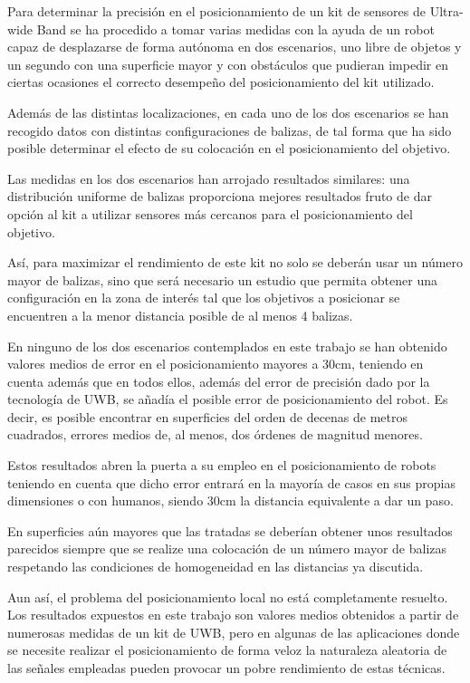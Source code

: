 Para determinar la precisión en el posicionamiento de un kit de sensores de Ultra-wide Band se ha procedido a tomar varias medidas con la ayuda de un robot capaz de desplazarse de forma autónoma en dos escenarios, uno libre de objetos y un segundo con una superficie mayor y con obstáculos que pudieran impedir en ciertas ocasiones el correcto desempeño del posicionamiento del kit utilizado.

Además de las distintas localizaciones, en cada uno de los dos escenarios se han recogido datos con distintas configuraciones de balizas, de tal forma que ha sido posible determinar el efecto de su colocación en el posicionamiento del objetivo.

Las medidas en los dos escenarios han arrojado resultados similares: una distribución uniforme de balizas proporciona mejores resultados fruto de dar opción al kit a utilizar sensores más cercanos para el posicionamiento del objetivo.

Así, para maximizar el rendimiento de este kit no solo se deberán usar un número mayor de balizas, sino que será necesario un estudio que permita obtener una configuración en la zona de interés tal que los objetivos a posicionar se encuentren a la menor distancia posible de al menos 4 balizas.

En ninguno de los dos escenarios contemplados en este trabajo se han obtenido valores medios de error en el posicionamiento mayores a 30cm, teniendo en cuenta además que en todos ellos, además del error de precisión dado por la tecnología de UWB, se añadía el posible error de posicionamiento del robot.
Es decir, es posible encontrar en superficies del orden de decenas de metros cuadrados, errores medios de, al menos, dos órdenes de magnitud menores.

Estos resultados abren la puerta a su empleo en el posicionamiento de robots teniendo en cuenta que dicho error entrará en la mayoría de casos en sus propias dimensiones o con humanos, siendo 30cm la distancia equivalente a dar un paso.

En superficies aún mayores que las tratadas se deberían obtener unos resultados parecidos siempre que se realize una colocación de un número mayor de balizas respetando las condiciones de homogeneidad en las distancias ya discutida.

Aun así, el problema del posicionamiento local no está completamente resuelto.
Los resultados expuestos en este trabajo son valores medios obtenidos a partir de numerosas medidas de un kit de UWB, pero en algunas de las aplicaciones donde se necesite realizar el posicionamiento de forma veloz la naturaleza aleatoria de las señales empleadas pueden provocar un pobre rendimiento de estas técnicas.

